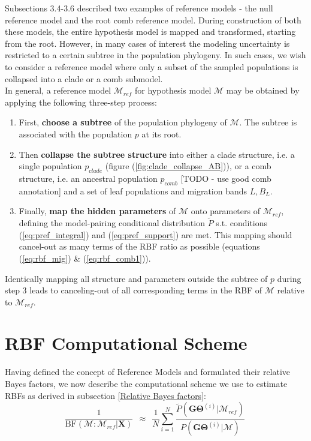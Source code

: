 \documentclass[11pt]{article}
\newcommand{\vect}[1]{\boldsymbol{\mathbf{#1}}}
\newcommand{\X}{\vect{X}}
\newcommand{\M}{\mathcal{M}}
\newcommand{\G}{\vect{G}}
\newcommand{\T}{\vect{\Theta}}
\newcommand{\GT}{\G\T}
\newcommand{\Mref}{\M_{ref}}
\newcommand{\Pref}{\widetilde{P}}
\newcommand{\rbf}{\text{BF}}
\newcommand{\1}{\mathbbm{1}}
\begin{document}
Subsections 3.4-3.6 described two examples of reference models - the null reference model and the root comb reference model. During construction of both these models, the entire hypothesis model is mapped and transformed, starting from the root.
%
However, in many cases of interest the modeling uncertainty is restricted to a certain subtree in the population phylogeny.
%
In such cases, we wish to consider a reference model where only a subset of the sampled populations is collapsed into a clade or a comb submodel.\\
%
In general, a reference model $\Mref$ for hypothesis model $\M$ may be obtained by applying the following three-step process:

\begin{enumerate}
\item First, \textbf{choose a subtree} of the population phylogeny of $\M$. The subtree is associated with the population $p$ at its root. 

\item Then \textbf{collapse the subtree structure} into either a clade structure, i.e. a single population $p_{clade}$ (figure (\ref{fig:clade_collapse_AB})), or a comb structure, i.e. an ancestral population $p_{comb}$ [TODO - use good comb annotation] and a set of leaf populations and migration bands $L, B_L$. 

\item Finally, \textbf{map the hidden parameters} of $\M$ onto parameters of $\Mref$, defining the model-pairing conditional distribution $\Pref$ s.t. conditions (\ref{eq:pref_integral}) and (\ref{eq:pref_support}) are met. This mapping should cancel-out as many terms of the RBF ratio as possible (equations (\ref{eq:rbf_mig}) \& (\ref{eq:rbf_comb1})).
\end{enumerate}

Identically mapping all structure and parameters outside the subtree of $p$ during step 3 leads to canceling-out of all corresponding terms in the RBF of $\M$ relative to $\Mref$.

\section{RBF Computational Scheme}
\label{sec:RBF Computational Scheme}

Having defined the concept of Reference Models and formulated their relative Bayes factors, we now describe the computational scheme we use to estimate RBFs as derived in subsection \ref{Relative Bayes factors}:
%
\begin{equation}
\label{eq:computational_scheme}
 \frac{1}{\rbf(\M:\Mref|\X)}  ~~\approx~~ \frac{1}{N} \sum_{i=1}^{N}\frac{\Pref(\GT^{(i)}|\Mref) }{P(\GT^{(i)}|\M)} ~ 
\end{equation}
\end{document}
